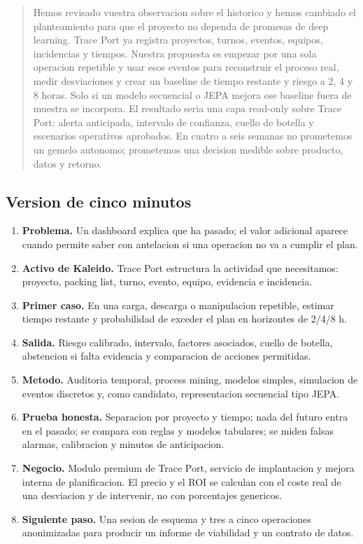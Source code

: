 \documentclass[
  spanish,
  10pt,
  a4paper,
]{article}
\providecommand{\tightlist}{%
  \setlength{\itemsep}{0pt}\setlength{\parskip}{0pt}}
\begin{document}
\begin{quote}
Hemos revisado vuestra observacion sobre el historico y hemos cambiado
el planteamiento para que el proyecto no dependa de promesas de deep
learning. Trace Port ya registra proyectos, turnos, eventos, equipos,
incidencias y tiempos. Nuestra propuesta es empezar por una sola
operacion repetible y usar esos eventos para reconstruir el proceso
real, medir desviaciones y crear un baseline de tiempo restante y riesgo
a 2, 4 y 8 horas. Solo si un modelo secuencial o JEPA mejora ese
baseline fuera de muestra se incorpora. El resultado seria una capa
read-only sobre Trace Port: alerta anticipada, intervalo de confianza,
cuello de botella y escenarios operativos aprobados. En cuatro a seis
semanas no prometemos un gemelo autonomo; prometemos una decision
medible sobre producto, datos y retorno.
\end{quote}

\subsection{Version de cinco minutos}\label{version-de-cinco-minutos}

\begin{enumerate}
\def\labelenumi{\arabic{enumi}.}
\tightlist
\item
  \textbf{Problema.} Un dashboard explica que ha pasado; el valor
  adicional aparece cuando permite saber con antelacion si una operacion
  no va a cumplir el plan.
\item
  \textbf{Activo de Kaleido.} Trace Port estructura la actividad que
  necesitamos: proyecto, packing list, turno, evento, equipo, evidencia
  e incidencia.
\item
  \textbf{Primer caso.} En una carga, descarga o manipulacion repetible,
  estimar tiempo restante y probabilidad de exceder el plan en
  horizontes de 2/4/8 h.
\item
  \textbf{Salida.} Riesgo calibrado, intervalo, factores asociados,
  cuello de botella, abstencion si falta evidencia y comparacion de
  acciones permitidas.
\item
  \textbf{Metodo.} Auditoria temporal, process mining, modelos simples,
  simulacion de eventos discretos y, como candidato, representacion
  secuencial tipo JEPA.
\item
  \textbf{Prueba honesta.} Separacion por proyecto y tiempo; nada del
  futuro entra en el pasado; se compara con reglas y modelos tabulares;
  se miden falsas alarmas, calibracion y minutos de anticipacion.
\item
  \textbf{Negocio.} Modulo premium de Trace Port, servicio de
  implantacion y mejora interna de planificacion. El precio y el ROI se
  calculan con el coste real de una desviacion y de intervenir, no con
  porcentajes genericos.
\item
  \textbf{Siguiente paso.} Una sesion de esquema y tres a cinco
  operaciones anonimizadas para producir un informe de viabilidad y un
  contrato de datos.
\end{enumerate}
\end{document}
